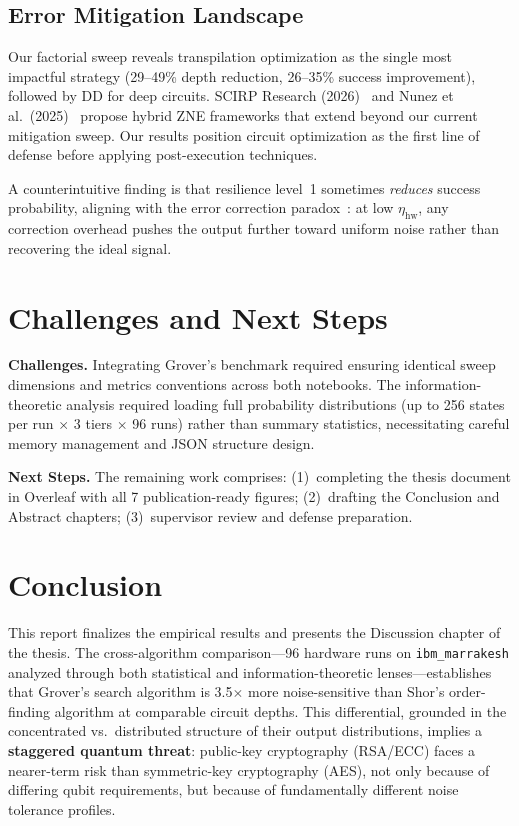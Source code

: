 \documentclass[conference]{IEEEtran}
\begin{document}
\subsection{Error Mitigation Landscape}

Our factorial sweep reveals transpilation optimization as the single most impactful strategy (29--49\% depth reduction, 26--35\% success improvement), followed by DD for deep circuits. SCIRP Research (2026)~\cite{b11} and Nunez et al.\ (2025)~\cite{b12} propose hybrid ZNE frameworks that extend beyond our current mitigation sweep. Our results position circuit optimization as the first line of defense before applying post-execution techniques.

A counterintuitive finding is that resilience level~1 sometimes \emph{reduces} success probability, aligning with the error correction paradox~\cite{b7}: at low $\eta_{\text{hw}}$, any correction overhead pushes the output further toward uniform noise rather than recovering the ideal signal.

\section{Challenges and Next Steps}

\textbf{Challenges.} Integrating Grover's benchmark required ensuring identical sweep dimensions and metrics conventions across both notebooks. The information-theoretic analysis required loading full probability distributions (up to 256 states per run $\times$ 3 tiers $\times$ 96 runs) rather than summary statistics, necessitating careful memory management and JSON structure design.

\textbf{Next Steps.} The remaining work comprises: (1)~completing the thesis document in Overleaf with all 7 publication-ready figures; (2)~drafting the Conclusion and Abstract chapters; (3)~supervisor review and defense preparation.

\section{Conclusion}

This report finalizes the empirical results and presents the Discussion chapter of the thesis. The cross-algorithm comparison---96 hardware runs on \texttt{ibm\_marrakesh} analyzed through both statistical and information-theoretic lenses---establishes that Grover's search algorithm is 3.5$\times$ more noise-sensitive than Shor's order-finding algorithm at comparable circuit depths. This differential, grounded in the concentrated vs.\ distributed structure of their output distributions, implies a \textbf{staggered quantum threat}: public-key cryptography (RSA/ECC) faces a nearer-term risk than symmetric-key cryptography (AES), not only because of differing qubit requirements, but because of fundamentally different noise tolerance profiles.
\end{document}

